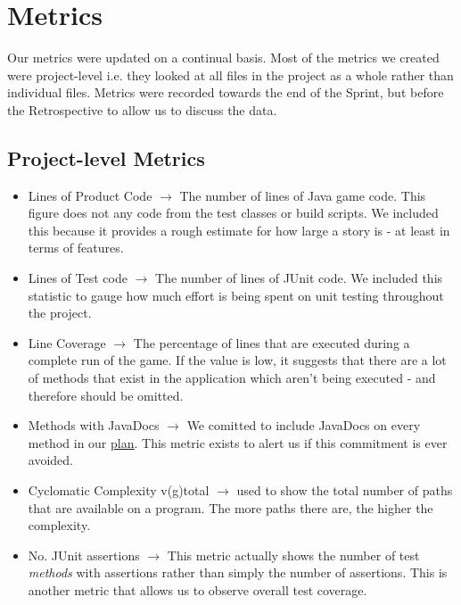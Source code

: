 \documentclass[12pt]{article}
\begin{document}
\newpage

\section{Metrics}

Our metrics were updated on a continual basis. Most of the metrics we created were project-level i.e. they looked at all files in the project as a whole rather than individual files. Metrics were recorded towards the end of the Sprint, but before the Retrospective to allow us to discuss the data.

\subsection{Project-level Metrics}

\vspace{0.3cm}
\begin{center}
    \noindent{}
\end{center}

\begin{itemize}
    \item Lines of Product Code $\longrightarrow$ The number of lines of Java game code. This figure does not any code from the test classes or build scripts. We included this because it provides a rough estimate for how large a story is - at least in terms of features.
    \item Lines of Test code $\longrightarrow$ The number of lines of JUnit code. We included this statistic to gauge how much effort is being spent on unit testing throughout the project.
    \item Line Coverage $\longrightarrow$ The percentage of lines that are executed during a complete run of the game. If the value is low, it suggests that there are a lot of methods that exist in the application which aren't being executed - and therefore should be omitted. 
    \item Methods with JavaDocs $\longrightarrow$ We comitted to include JavaDocs on every method in our \underline{\hyperref[practices]{plan}}. This metric exists to alert us if this commitment is ever avoided.
    \item Cyclomatic Complexity v(g)total $\longrightarrow$ used to show the total number of paths that are available on a program. The more paths there are, the higher the complexity.
    \item No. JUnit assertions $\longrightarrow$ This metric actually shows the number of test \emph{methods} with assertions rather than simply the number of assertions. This is another metric that allows us to observe overall test coverage.
\end{itemize}
\newpage
\end{document}
